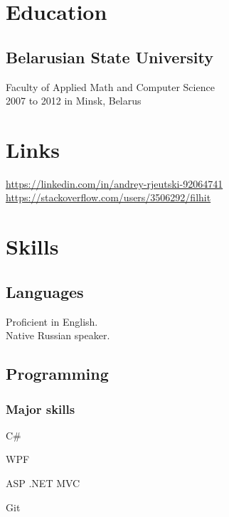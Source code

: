\documentclass[a4paper,11pt]{article}
\newcommand{\minsk}{Minsk, Belarus}
\newcommand{\periodinminsk}[1]{{\footnotesize #1 in \minsk}}
\begin{document}
  \vspace{0.5cm}
  \begin{minipage}[t]{0.34\textwidth}
    \section*{Education} 
    \subsection*{Belarusian State University}
    Faculty of Applied Math and Computer Science\\
    \periodinminsk{2007 to 2012}
    \section*{Links} 
    \href{https://linkedin.com/in/andrey-rjeutski-92064741}{https://linkedin.com/in/andrey-rjeutski-92064741}\\
    \href{https://stackoverflow.com/users/3506292/filhit}{https://stackoverflow.com/\allowbreak users/3506292/filhit}
    \section*{Skills}
    \subsection*{Languages}
    Proficient in English.\\
    Native Russian speaker.
    \subsection*{Programming}
    \subsubsection*{Major skills}
    \begin{inparaitem}
      \item C\# 
      \item WPF
      \item ASP .NET MVC
      \item Git
    \end{inparaitem}

\end{minipage}
\end{document}
